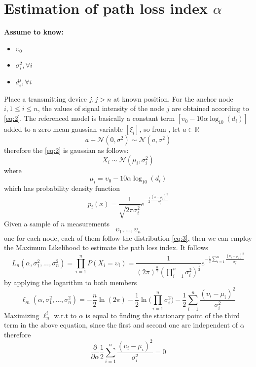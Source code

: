 \documentclass[12pt,twoside]{report}
\begin{document}
\section{Estimation of path loss index $\alpha$}
  \begin{center}
  \textbf{Assume to know:}
  \begin{itemize}
    \centering
    \item $\upsilon_0$
    \item $\sigma^2_i,\forall i$
    \item $d_i^j,\forall i$
  \end{itemize}
  \end{center}
  Place a transmitting device $j,j>n$ at known position. For the anchor node $i,1\leq i\leq n$, the values of signal intensity of the node $j$ are obtained according to \ref{eq:2}. The referenced model is basically a constant term $[\upsilon_0-10\alpha\log_{10}(d_i)]$ added to a zero mean gaussian variable $[\xi_i]$, so from \cite{alma9926534668905776}, let $a \in \mathbb{R}$
\begin{equation}
a+\mathcal{N}(0,\sigma^2)\sim\mathcal{N}(a,\sigma^2)
\end{equation} therefore the \ref{eq:2} is gaussian as follows:
\begin{equation}
    X_i\sim \mathcal{N}(\mu_i,\sigma^2_i)
    \label{eq:3}
\end{equation}
where 
\begin{equation}
    \mu_i = \upsilon_0-10\alpha\log_{10}(d_i)
\end{equation}
which has probability density function
\begin{equation}
    p_i(x)=\frac{1}{\sqrt{2\pi\sigma_i^2}}e^{-\frac{1}{2}\frac{(x-\mu_i)^2}{\sigma^2_i}}
    \label{eq:20}
\end{equation} 
Given a sample of $n$ measurements $$\upsilon_1,...,\upsilon_n$$ one for each node, each of them follow the distribution \ref{eq:3}, then we can employ the Maximum Likelihood to estimate the path loss index. It follows
\begin{equation}
    L_n(\alpha,\sigma_1^2,...,\sigma_n^2)=\prod_{i=1}^nP(X_i=\upsilon_i)=
    \frac{1}{(2\pi)^{\frac{n}{2}}(\prod_{i=1}^n\sigma_i^2)^\frac{1}{2}}e^{-\frac{1}{2}\sum_{i=1}^n\frac{(\upsilon_i-\mu_i)^2}{\sigma^2_i}}
\end{equation}
by applying the logarithm to both members
\begin{equation}
    \ell_m(\alpha,\sigma_1^2,...,\sigma_n^2)=-\frac{n}{2}\ln(2\pi)-\frac{1}{2}\ln\bigg(\prod_{i=1}^n\sigma^2_i\bigg)-\frac{1}{2}\sum_{i=1}^n\frac{(\upsilon_i-\mu_i)^2}{\sigma^2_i}
    \label{eq:4}
\end{equation}
Maximizing $\ell_n^i$ w.r.t to $\alpha$ is equal to finding the stationary point of the third term in the above equation, since the first and second one are independent of $\alpha$ therefore \cite{MUNOZ200923} 
\begin{equation}
\frac{\partial}{\partial \alpha} \frac{1}{2}\sum_{i=1}^n\frac{(\upsilon_i-\mu_i)^2}{\sigma^2_i} =0
\end{equation}
\end{document}
